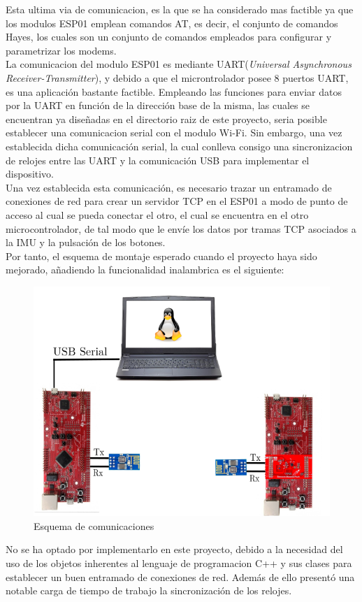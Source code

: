\documentclass[a4paper,twoside]{article}
\begin{document}
Esta ultima via de comunicacion, es la que se ha considerado mas factible ya que los modulos ESP01 emplean comandos AT, es decir, el conjunto de comandos Hayes, los cuales son un conjunto de comandos empleados para configurar y parametrizar los modems. \\
La comunicacion del modulo ESP01 es mediante UART(\textit{Universal Asynchronous Receiver-Transmitter}), y debido a que el microntrolador posee 8 puertos UART, es una aplicación bastante factible. Empleando las funciones para enviar datos por la UART en función de la dirección base de la misma, las cuales se encuentran ya diseñadas en el directorio raiz de este proyecto, seria posible establecer una comunicacion serial con el modulo Wi-Fi. Sin embargo, una vez establecida dicha comunicación serial, la cual conlleva consigo una sincronizacion de relojes entre las UART y la comunicación USB para implementar el dispositivo. \\
Una vez establecida esta comunicación, es necesario trazar un entramado de conexiones de red para crear un servidor TCP en el ESP01 a modo de punto de acceso al cual se pueda conectar el otro, el cual se encuentra en el otro microcontrolador, de tal modo que le envíe los datos por tramas TCP asociados a la IMU y la pulsación de los botones.\\

Por tanto, el esquema de montaje esperado cuando el proyecto haya sido mejorado, añadiendo la funcionalidad inalambrica es el siguiente:
\begin{figure}[h!]
 \centering
 \includegraphics[width=.7\textwidth]{../images/mejora_esp}
 \caption{Esquema de comunicaciones}
\end{figure}


No se ha optado por implementarlo en este proyecto, debido a la necesidad del uso de los objetos inherentes al lenguaje de programacion C++ y sus clases para establecer un buen entramado de conexiones de red. Además de ello presentó una notable carga de tiempo de trabajo la sincronización de los relojes. \\
\end{document}
